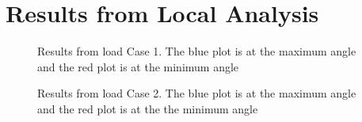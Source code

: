 \chapter{Results from Local Analysis}
\label{appendix:C}

\begin{figure}[H]
\hfill
{}\hfill
\caption[$\; \:$Results from load Case 1]{Results from load Case 1. The blue plot is at the maximum angle and the red plot is at the minimum angle}
\label{fig:r1}
\end{figure}

\begin{figure}[H]
\hfill
{}\hfill
\caption[$\; \:$Results from load Case 2]{Results from load Case 2. The blue plot is at the maximum angle and the red plot is at the the minimum angle}
\label{fig:r2}
\end{figure}

